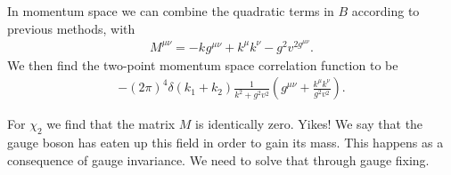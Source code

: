 In momentum space we can combine the quadratic terms in $B$ according to previous methods, with
\begin{align*}
	M^{\mu\nu} = -k^{}g^{\mu\nu} + k^{\mu}k^{\nu} - g^{2}v^{2g^{\mu\nu}}.
\end{align*}
We then find the two-point momentum space correlation function to be
\begin{align*}
	-(2\pi)^{4}\delta(k_{1} + k_{2})\frac{1}{k^{2} + g^{2}v^{2}}\left(g^{\mu\nu} + \frac{k^{\mu}k^{\nu}}{g^{2}v^{2}}\right).
\end{align*}

For $\chi_{2}$ we find that the matrix $M$ is identically zero. Yikes! We say that the gauge boson has eaten up this field in order to gain its mass. This happens as a consequence of gauge invariance. We need to solve that through gauge fixing.